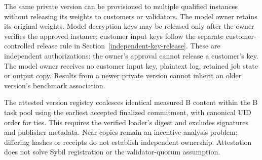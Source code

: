 The same private version can be provisioned to multiple qualified instances
without releasing its weights to customers or validators. The model owner
retains its original weights. Model decryption keys may be released only
after the owner verifies the approved instance; customer input keys follow
the separate customer-controlled release rule in
Section~\ref{independent-key-release}. These are independent authorizations:
the owner's approval cannot release a customer's key. The model owner receives no
customer input key, plaintext log, retained job state or output copy.
Results from a newer private version cannot inherit an older version's
benchmark association.

The attested version registry coalesces identical measured B content
within the B task pool using the earliest accepted finalized commitment,
with canonical UID order for ties. This requires the verified loader's
digest and excludes signatures and publisher metadata. Near copies remain
an incentive-analysis problem; differing hashes or receipts do not
establish independent ownership. Attestation
does not solve Sybil registration or the validator-quorum assumption.
